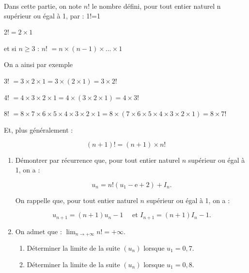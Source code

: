 \documentclass{cornouaille}
\begin{document}
\begin{exercice}[Pondichéry 2019]
Dans cette partie, on note $n$! le nombre défini, pour tout entier naturel n supérieur ou égal à 1, par : 1!=1 

2!$ =2 \times 1$ 

et si $n \geqslant 3$ : 
$n$! $= n \times  (n-1) \times  \ldots  \times 1$ 

On a ainsi par exemple 

3! $= 3\times 2\times 1 = 3\times(2 \times 1) = 3\times 2$! 

4! $= 4\times 3\times 2\times 1 = 4\times (3\times 2\times 1) = 4\times 3$! 

8! $= 8\times 7\times 6\times 5\times 4\times 3\times 2\times 1 = 8\times(7\times 6\times 5\times 4\times 3\times 2\times 1) = 8\times 7$! 

Et, plus généralement : 

\[(n+1)\text{!} = (n+1)  \times n\text{!}\]

\smallskip 

\begin{enumerate}
\item Démontrer par récurrence que, pour tout entier naturel $n$ supérieur ou égal à 1, on a : 

\[u_n =n\text{!}\left(u_1 - \text{e} + 2\right)+ I_n.\] 

On rappelle que, pour tout entier naturel $n$ supérieur ou égal à 1, on a :

\[ u_{n+1} = (n+1)u_{n} - 1\quad \text{ et } I_{n+1} = (n+1)I_{n} - 1.\] 

\item  On admet que : $\displaystyle\lim_{n \to + \infty} n\text{!} = + \infty$. 
	\begin{enumerate}
		\item Déterminer la limite de la suite $\left(u_n\right)$ lorsque $u_1 = 0,7$. 
		\item Déterminer la limite de la suite $\left(u_n\right)$ lorsque $u_1 = 0,8$. 
	\end{enumerate}
\end{enumerate}
\end{exercice}
\end{document}
